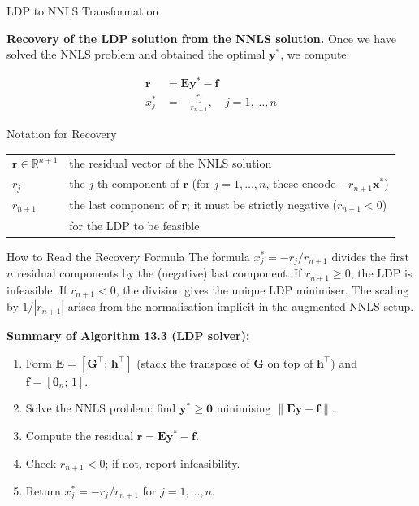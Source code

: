 \documentclass[aspectratio=169,10pt]{beamer}
\newcommand{\bx}{\mathbf{x}}
\newcommand{\bG}{\mathbf{G}}
\newcommand{\bh}{\mathbf{h}}
\newcommand{\bE}{\mathbf{E}}
\newcommand{\R}{\mathbb{R}}
\begin{document}
\begin{frame}[allowframebreaks]{LDP to NNLS Transformation}
  \framebreak

  \textbf{Recovery of the LDP solution from the NNLS solution.}  Once we have
  solved the NNLS problem and obtained the optimal $\mathbf{y}^*$, we compute:

  \begin{align}
    \mathbf{r} &= \bE\mathbf{y}^* - \mathbf{f} \tag{13.34}\\[4pt]
    x_j^* &= -\frac{r_j}{r_{n+1}},\quad j=1,\ldots,n \tag{13.35}
  \end{align}

  \begin{block}{Notation for Recovery}
    \begin{tabular}{ll}
      $\mathbf{r} \in \R^{n+1}$ & the residual vector of the NNLS solution\\
      $r_j$ & the $j$-th component of $\mathbf{r}$ (for $j = 1,\ldots,n$, these encode $-r_{n+1}\bx^*$)\\
      $r_{n+1}$ & the last component of $\mathbf{r}$; it must be strictly negative ($r_{n+1} < 0$)\\
                 & for the LDP to be feasible\\
    \end{tabular}
  \end{block}

  \begin{alertblock}{How to Read the Recovery Formula}
    The formula $x_j^* = -r_j / r_{n+1}$ divides the first $n$ residual components
    by the (negative) last component.  If $r_{n+1} \geq 0$, the LDP is infeasible.
    If $r_{n+1} < 0$, the division gives the unique LDP minimiser.  The scaling by
    $1/|r_{n+1}|$ arises from the normalisation implicit in the augmented NNLS setup.
  \end{alertblock}

  \textbf{Summary of Algorithm 13.3 (LDP solver):}
  \begin{enumerate}
    \item Form $\bE = [\bG^{\top};\, \bh^{\top}]$ (stack the transpose of $\bG$ on top of $\bh^{\top}$)
          and $\mathbf{f} = [\mathbf{0}_n;\, 1]$.
    \item Solve the NNLS problem: find $\mathbf{y}^* \geq \mathbf{0}$ minimising $\|\bE\mathbf{y} - \mathbf{f}\|$.
    \item Compute the residual $\mathbf{r} = \bE\mathbf{y}^* - \mathbf{f}$.
    \item Check $r_{n+1} < 0$; if not, report infeasibility.
    \item Return $x_j^* = -r_j / r_{n+1}$ for $j = 1,\ldots,n$.
  \end{enumerate}

\end{frame}
\end{document}
